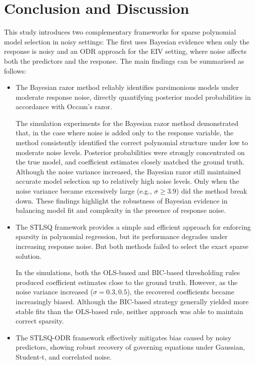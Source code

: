 \section{Conclusion and Discussion}
\label{sec:disc}

This study introduces two complementary frameworks for sparse polynomial model selection in noisy settings:
The first uses Bayesian evidence when only the response is noisy and an ODR approach for the EIV setting, where noise affects both the predictors and the response.
The main findings can be summarised as follows:
\begin{itemize}
    \item The Bayesian razor method reliably identifies parsimonious models under moderate response noise, directly quantifying posterior model probabilities in accordance with Occam’s razor.
    
    The simulation experiments for the Bayesian razor method demonstrated that, in the case where noise is added only to the response variable, the method consistently identified the correct polynomial structure under low to moderate noise levels. Posterior probabilities were strongly concentrated on the true model, and coefficient estimates closely matched the ground truth. Although the noise variance increased, the Bayesian razor still maintained accurate model selection up to relatively high noise levels. Only when the noise variance became excessively large (e.g., $\sigma \ge 3.9$) did the method break down. These findings highlight the robustness of Bayesian evidence in balancing model fit and complexity in the presence of response noise.
    \item The STLSQ framework provides a simple and efficient approach for enforcing sparsity in polynomial regression, but its performance degrades under increasing response noise. But both methods failed to select the exact sparse solution.

    In the simulations, both the OLS-based and BIC-based thresholding rules produced coefficient estimates close to the ground truth. However, as the noise variance increased ($\sigma = 0.3, 0.5$), the recovered coefficients became increasingly biased. Although the BIC-based strategy generally yielded more stable fits than the OLS-based rule, neither approach was able to maintain correct sparsity. 

    \item The STLSQ-ODR framework effectively mitigates bias caused by noisy predictors, showing robust recovery of governing equations under Gaussian, Student-t, and correlated noise.
    

\end{itemize}
